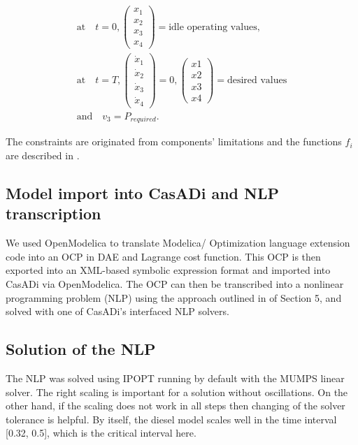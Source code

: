\begin{equation*}
 \begin{aligned}
	\text{at}\quad t = 0,  \begin{pmatrix} x_1 \\ x_2 \\x_3 \\x_4  \end{pmatrix} = \text{idle operating values,} \\
	\text{at}\quad t = T,  \begin{pmatrix} \dot{x}_1 \\ \dot{x}_2 \\\dot{x}_3\\\dot{x}_4 \end{pmatrix} = 0,  \begin{pmatrix} x1 \\ x2 \\x3 \\x4  \end{pmatrix} = \text{desired values} \\
	\text{and}\quad v_3 = P_{required}.
 \end{aligned}
\end{equation*}

The constraints are originated from components’ limitations and the functions $ f_i$ are described in \cite{sivertsson}.

\subsection{Model import into CasADi and NLP transcription}
\label{sec:optimizationxmlimport}

We used OpenModelica to translate Modelica/ Optimization
language extension code into an OCP in DAE and Lagrange
cost function. This OCP is then exported into an XML-based
symbolic expression format and imported into CasADi via
OpenModelica. The OCP can then be transcribed into a
nonlinear programming problem (NLP) using the approach
outlined in \cite{bernhard} of Section 5, and solved with one of CasADi’s interfaced NLP solvers.

\subsection{Solution of the NLP}
\label{sec:optimizationnlp}

The NLP was solved using IPOPT \cite{wachter} running by default with the MUMPS linear solver.
The right scaling is important for a solution without oscillations.
On the other hand, if the scaling does not work in all steps
then changing of the solver tolerance is helpful. By itself, the diesel model
scales well in the time interval [0.32, 0.5],
which is the critical interval here.

